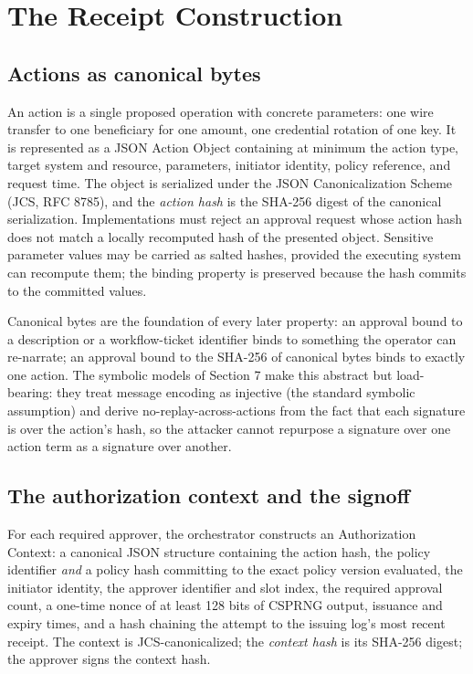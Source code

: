 \documentclass[11pt]{article}
\begin{document}
\section{The Receipt Construction}

\subsection{Actions as canonical bytes}

An action is a single proposed operation with concrete parameters: one wire
transfer to one beneficiary for one amount, one credential rotation of one key. It
is represented as a JSON Action Object containing at minimum the action type,
target system and resource, parameters, initiator identity, policy reference, and
request time. The object is serialized under the JSON Canonicalization Scheme
(JCS, RFC 8785), and the \emph{action hash} is the SHA-256 digest of the canonical
serialization. Implementations must reject an approval request whose action hash
does not match a locally recomputed hash of the presented object. Sensitive
parameter values may be carried as salted hashes, provided the executing system
can recompute them; the binding property is preserved because the hash commits to
the committed values.

Canonical bytes are the foundation of every later property: an approval bound to a
description or a workflow-ticket identifier binds to something the operator can
re-narrate; an approval bound to the SHA-256 of canonical bytes binds to exactly
one action. The symbolic models of Section 7 make this abstract but load-bearing:
they treat message encoding as injective (the standard symbolic assumption) and
derive no-replay-across-actions from the fact that each signature is over the
action's hash, so the attacker cannot repurpose a signature over one action term
as a signature over another.

\subsection{The authorization context and the signoff}

For each required approver, the orchestrator constructs an Authorization Context: a
canonical JSON structure containing the action hash, the policy identifier
\emph{and} a policy hash committing to the exact policy version evaluated, the
initiator identity, the approver identifier and slot index, the required approval
count, a one-time nonce of at least 128 bits of CSPRNG output, issuance and expiry
times, and a hash chaining the attempt to the issuing log's most recent receipt.
The context is JCS-canonicalized; the \emph{context hash} is its SHA-256 digest;
the approver signs the context hash.
\end{document}
